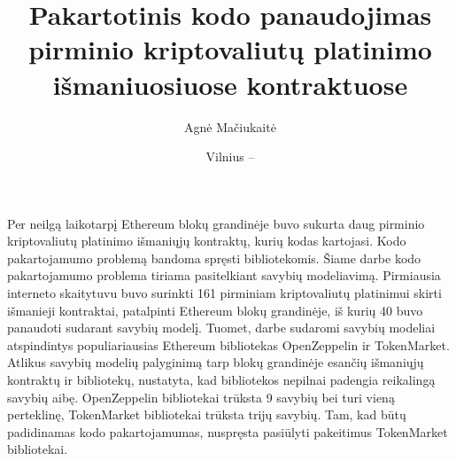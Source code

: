 \documentclass{VUMIFPSbakalaurinis}
\title{Pakartotinis kodo panaudojimas pirminio kriptovaliutų platinimo išmaniuosiuose kontraktuose}
\author{Agnė Mačiukaitė}
\date{Vilnius – \the\year}
\begin{document}
\maketitle




Per neilgą laikotarpį Ethereum blokų grandinėje buvo sukurta daug pirminio kriptovaliutų platinimo išmaniųjų kontraktų, kurių kodas kartojasi. Kodo pakartojamumo problemą bandoma spręsti bibliotekomis. Šiame darbe kodo pakartojamumo problema tiriama pasitelkiant savybių modeliavimą. Pirmiausia interneto skaitytuvu buvo surinkti 161 pirminiam kriptovaliutų platinimui skirti išmanieji kontraktai, patalpinti Ethereum blokų grandinėje, iš kurių 40 buvo panaudoti sudarant savybių modelį. Tuomet, darbe sudaromi savybių modeliai atspindintys populiariausias Ethereum bibliotekas OpenZeppelin ir TokenMarket. Atlikus savybių modelių palyginimą tarp blokų grandinėje esančių išmaniųjų kontraktų ir bibliotekų, nustatyta, kad bibliotekos nepilnai padengia reikalingą savybių aibę. OpenZeppelin bibliotekai trūksta 9 savybių bei turi vieną perteklinę, TokenMarket bibliotekai trūksta trijų savybių. Tam, kad būtų padidinamas kodo pakartojamumas, nuspręsta pasiūlyti pakeitimus TokenMarket bibliotekai.

\end{document}
